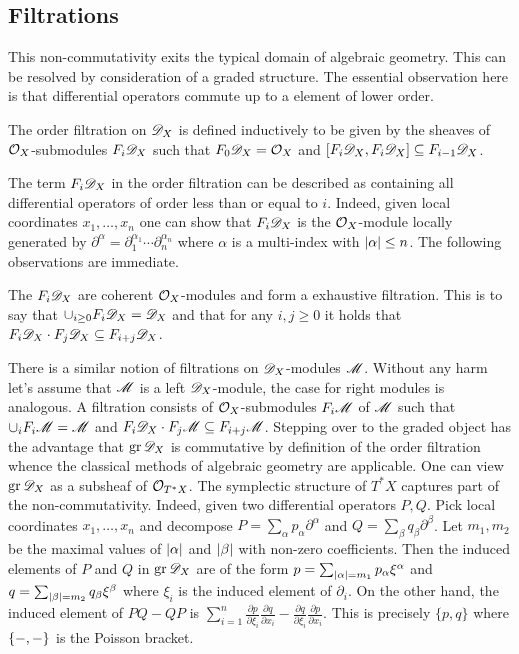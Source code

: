 \subsection{Filtrations}
This non-commutativity exits the typical domain of algebraic geometry.
This can be resolved by consideration of a graded structure.
The essential observation here is that differential operators commute up to a element of lower order.
\begin{definition}
  The order filtration on $\mathscr{D}_X$ is defined inductively to be given by the sheaves of $\mathcal{O}_X$-submodules $F_i \mathscr{D}_X$ such that $F_0\mathscr{D}_X = \mathcal{O}_X$ and $[F_i\mathscr{D}_X, F_i \mathscr{D}_X] \subseteq F_{i-1}\mathscr{D}_X$.
\end{definition}
The term $F_i \mathscr{D}_X$ in the order filtration can be described as containing all differential operators of order less than or equal to $i$.
Indeed, given local coordinates $x_1,\ldots, x_n$ one can show that $F_i\mathscr{D}_X$ is the $\mathcal{O}_X$-module locally generated by $\partial^\alpha = \partial_1^{\alpha_1}\cdots \partial_n^{\alpha_n}$ where $\alpha$ is a multi-index with $\vert \alpha \vert\leq n$.
The following observations are immediate.
\begin{lemma}
  The $F_i\mathscr{D}_X$ are coherent $\mathcal{O}_X$-modules and form a exhaustive filtration. This is to say that $\cup_{i\geq 0}F_i\mathscr{D}_X = \mathscr{D}_X$
  and that for any $i,j\geq 0$ it holds that $F_i\mathscr{D}_X \cdot F_j \mathscr{D}_X \subseteq F_{i+j}\mathscr{D}_X$.
\end{lemma}
There is a similar notion of filtrations on $\mathscr{D}_X$-modules $\mathscr{M}$.
Without any harm let's assume that $\mathscr{M}$ is a left $\mathscr{D}_X$-module, the case for right modules is analogous.
A filtration consists of $\mathcal{O}_X$-submodules $F_i\mathscr{M}$ of $\mathscr{M}$ such that $\cup_i F_i \mathscr{M} = \mathscr{M}$ and $F_i\mathscr{D}_X \cdot F_j\mathscr{M} \subseteq F_{i+j}\mathscr{M}$.
Stepping over to the graded object has the advantage that $\operatorname{gr} \mathscr{D}_X$ is commutative by definition of the order filtration whence the classical methods of algebraic geometry are applicable.
One can view $\operatorname{gr}\mathscr{D}_X$ as a subsheaf of $\mathcal{O}_{T^*X}$.
The symplectic structure of $T^* X$ captures part of the non-commutativity.
Indeed, given two differential operators $P, Q$.
Pick local coordinates $x_1,\ldots, x_n$ and decompose $P = \sum_{\alpha} p_\alpha \partial^\alpha $ and $Q = \sum_{\beta} q_\beta \partial^\beta$.
Let $m_1,m_2$ be the maximal values of $\vert \alpha \vert$ and $\vert \beta \vert$ with non-zero coefficients.
Then the induced elements of $P$ and $Q$ in $\operatorname{gr} \mathscr{D}_X$ are of the form $p = \sum_{\vert \alpha \vert = m_1} p_\alpha \xi^\alpha$ and $q = \sum_{\vert \beta \vert = m_2}q_\beta \xi^\beta $ where $\xi_i$ is the induced element of $\partial_i$.
On the other hand, the induced element of $PQ - QP$ is $\sum_{i=1}^n\frac{\partial p}{\partial \xi_i}\frac{\partial q}{\partial x_i} - \frac{\partial q}{\partial \xi_i}\frac{\partial p}{\partial x_i}$.
This is precisely $\{p,q\}$ where $\{{-},{-}\}$ is the Poisson bracket.

